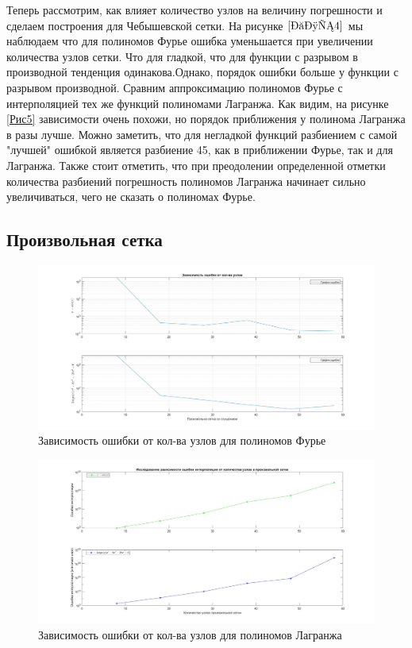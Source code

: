 \documentclass[a4paper]{article}
\begin{document}
Теперь рассмотрим, как влияет количество узлов на величину погрешности и сделаем построения для Чебышевской сетки. На рисунке $\ref{Рис4}$ мы наблюдаем что для полиномов Фурье ошибка уменьшается при увеличении количества узлов сетки. Что для гладкой, что для функции с разрывом в производной тенденция одинакова.Однако, порядок ошибки больше у функции с разрывом производной. Сравним аппроксимацию полиномов Фурье с интерполяцией тех же функций полиномами Лагранжа. Как видим, на рисунке \ref{Рис5} зависимости очень похожи, но порядок приближения у полинома Лагранжа в разы лучше. Можно заметить, что для негладкой функций разбиением с самой "лучшей" ошибкой является разбиение 45, как в приближении Фурье, так и для Лагранжа. Также стоит отметить, что при преодолении определенной отметки количества разбиений погрешность полиномов Лагранжа начинает  сильно увеличиваться, чего не сказать о полиномах Фурье.


\subsection{Произвольная сетка}
\begin{figure}[h!]
\begin{center}
\includegraphics[scale=0.3]{ависимость ошибки от кол-ва узлов произвольная сетка.jpg}  
\end{center}
\caption{Зависимость ошибки от кол-ва узлов для полиномов Фурье} \label{Рис6}
\end{figure}
 \begin{figure}[h!]
\begin{center}
\includegraphics[scale=0.3]{кол-во узлов Произвольная.jpg} 
\end{center}
\caption{Зависимость ошибки от кол-ва узлов для полиномов Лагранжа} \label{Рис7}
\end{figure}
\end{document}
